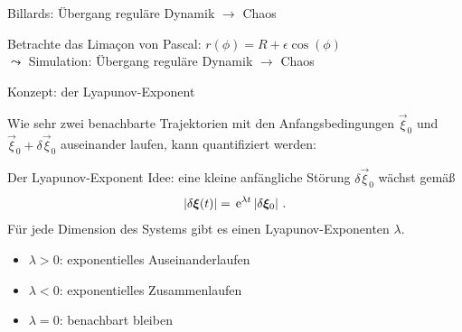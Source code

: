 \begin{frame}{Billards: Übergang reguläre Dynamik $\to$ Chaos}

  Betrachte das Lima\c{c}on von Pascal: $r(\phi) = R + \epsilon\cos(\phi)$\\[0.5ex]
  $\leadsto$ \alert{Simulation}: Übergang reguläre Dynamik $\to$ Chaos\\[1ex]

\end{frame}


\begin{frame}{Konzept: der Lyapunov-Exponent}

  Wie sehr zwei benachbarte Trajektorien mit den Anfangsbedingungen $\vec\xi_0$ und $\vec\xi_0 + \delta\vec\xi_0$ auseinander laufen, kann quantifiziert werden:

  \begin{alertbbox}{Der Lyapunov-Exponent}
    Idee: eine kleine anfängliche  Störung $\delta\vec\xi_0$ wächst gemäß
    \[\left\vert \delta{\ensuremath{\boldsymbol{\xi}}}(t) \right\vert = \,{\mathrm{e}}^{\lambda t}\left\vert \delta{\ensuremath{\boldsymbol{\xi}}}_0 \right\vert\,.\]
    Für jede Dimension des Systems gibt es einen Lyapunov-Exponenten $\lambda$.
  \end{alertbbox}
  \begin{itemize}
  \item $\lambda > 0$: exponentielles Auseinanderlaufen
  \item $\lambda < 0$: exponentielles Zusammenlaufen
  \item $\lambda = 0$: benachbart bleiben
  \end{itemize}
\end{frame}


